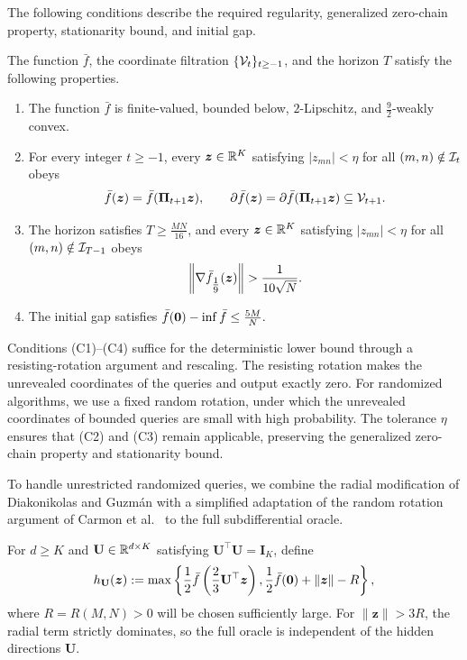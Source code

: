 The following conditions describe the required
regularity, generalized zero-chain property, stationarity
bound, and initial gap.
\begin{condition}
\label{cond:hard-instance}
The function $\bar f$, the coordinate filtration
$\{{\cal V}_t\}_{t\ge-1}$, and the horizon $T$
satisfy the following properties.
\begin{enumerate}
 \item[\textnormal{(C1)}]
 The function $\bar f$ is finite-valued, bounded below,
 $2$-Lipschitz, and $\tfrac92$-weakly convex.
  \item[\textnormal{(C2)}]
For every integer $t\ge-1$, every $\bm{z}\in{\mathbb{R}}^K$ satisfying
 $|z_{mn}|<\eta$ for all $(m,n)\notin{\cal I}_t$
 obeys
 \[
  \bar f(\bm{z})=\bar f(\mathbf{\Pi}_{t+1}\bm{z}),
  \qquad
  \partial \bar f(\bm{z})
  =\partial \bar f(\mathbf{\Pi}_{t+1}\bm{z})
  \subseteq{\cal V}_{t+1}.
 \]
 \item[\textnormal{(C3)}]
 The horizon satisfies $T\ge\tfrac{MN}{16}$,
 and every $\bm{z}\in{\mathbb{R}}^K$ satisfying
 $|z_{mn}|<\eta$ for all $(m,n)\notin{\cal I}_{T-1}$
 obeys
 \[
  \left\|\nabla \bar f_{\tfrac19}(\bm{z})\right\|
  >\frac1{10\sqrt N}.
 \]
  \item[\textnormal{(C4)}]
 The initial gap satisfies
 $
  \bar f({\mathbf 0})-\inf \bar f\le\frac{5M}{N}.
 $
 \end{enumerate}
 \end{condition}

\begin{remark}
Conditions \textnormal{(C1)--(C4)} suffice for the
deterministic lower bound through a resisting-rotation
argument and rescaling.
The resisting rotation makes the unrevealed coordinates
of the queries and output exactly zero.
For randomized algorithms, we use a fixed random rotation,
under which the unrevealed coordinates of bounded queries
are small with high probability.
The tolerance $\eta$ ensures that \textnormal{(C2)} and
\textnormal{(C3)} remain applicable, preserving the
generalized zero-chain property and stationarity bound.
\end{remark}

To handle unrestricted randomized queries, we combine
the radial modification of Diakonikolas and Guzm\'an
\citep[Section~2.1, Eq.~(3)]{DiakonikolasGuzman2020}
with a simplified adaptation of the random rotation
argument of Carmon et al.\
\citep[Section~5.1]{carmon2020lower}
to the full subdifferential oracle.

For $d\ge K$ and
$\mathbf{U}\in{\mathbb{R}}^{d\times K}$ satisfying
$\mathbf{U}^\top\mathbf{U}=\mathbf{I}_K$, define
\begin{equation}
 h_{\mathbf{U}}(\bm z)
 :=
 \max\left\{
 \frac12\bar f\left(\frac23\mathbf{U}^\top\bm z\right),
 \frac12\bar f({\mathbf 0})+\|\bm z\|-R
 \right\},
 \label{eq:radial-instance}
\end{equation}
where $R=R(M,N)>0$ will be chosen sufficiently large.
For $\|\bm z\|>3R$, the radial term strictly
dominates, so the full oracle is independent
of the hidden directions $\mathbf{U}$.

